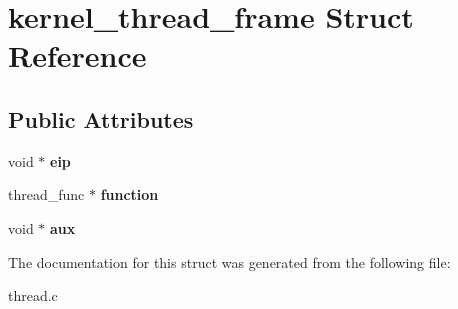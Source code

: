 \hypertarget{structkernel__thread__frame}{}\section{kernel\+\_\+thread\+\_\+frame Struct Reference}
\label{structkernel__thread__frame}
\subsection*{Public Attributes}
\begin{DoxyCompactItemize}
\item 
void $\ast$ {\bfseries eip}\hypertarget{structkernel__thread__frame_ad09a36aad7e8ab228235d49f0975edf4}{}\label{structkernel__thread__frame_ad09a36aad7e8ab228235d49f0975edf4}

\item 
thread\+\_\+func $\ast$ {\bfseries function}\hypertarget{structkernel__thread__frame_ab291ec9659556df6e215dc2d1201515b}{}\label{structkernel__thread__frame_ab291ec9659556df6e215dc2d1201515b}

\item 
void $\ast$ {\bfseries aux}\hypertarget{structkernel__thread__frame_a6bcf2dfdd3a5803ce9dd714e1690c200}{}\label{structkernel__thread__frame_a6bcf2dfdd3a5803ce9dd714e1690c200}

\end{DoxyCompactItemize}


The documentation for this struct was generated from the following file\+:\begin{DoxyCompactItemize}
\item 
thread.\+c\end{DoxyCompactItemize}
